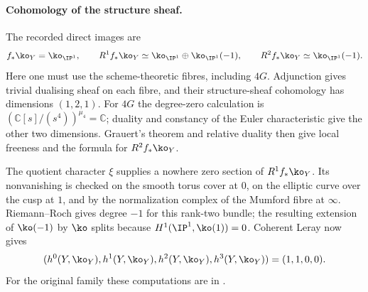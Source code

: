 	\paragraph{Cohomology of the structure sheaf.}
	The recorded direct images are
	\[
	f_*\ko_Y=\ko_{\IP^1},\qquad
	R^1f_*\ko_Y\simeq\ko_{\IP^1}\oplus\ko_{\IP^1}(-1),\qquad
	R^2f_*\ko_Y\simeq\ko_{\IP^1}(-1).
	\]
	Here one must use the scheme-theoretic fibres, including $4G$.
	Adjunction gives trivial dualising sheaf on each fibre, and their
	structure-sheaf cohomology has dimensions $(1,2,1)$. For $4G$ the
	degree-zero calculation is
	$(\mathbb C[s]/(s^4))^{\mu_4}=\mathbb C$; duality and constancy
	of the Euler characteristic give the other two dimensions.
	Grauert's theorem and relative duality then give local freeness
	and the formula for $R^2f_*\ko_Y$.
	
	The quotient character $\xi$ supplies a nowhere zero section of
	$R^1f_*\ko_Y$. Its nonvanishing is checked on the smooth torus
	cover at $0$, on the elliptic curve over the cusp at $1$, and by
	the normalization complex of the Mumford fibre at $\infty$.
	Riemann--Roch gives degree $-1$ for this rank-two bundle; the
	resulting extension of $\ko(-1)$ by $\ko$ splits because
	$H^1(\IP^1,\ko(1))=0$. Coherent Leray now gives
	\[
	(h^0(Y,\ko_Y),h^1(Y,\ko_Y),h^2(Y,\ko_Y),h^3(Y,\ko_Y))
	=(1,1,0,0).
	\]
	For the original family these computations are in
	\cite[Proposition~9.13]{Alpoge2026}.
	
